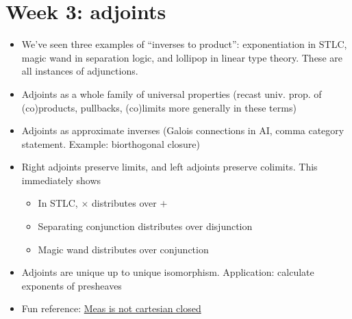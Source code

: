 \chapter{Week 3: adjoints}

\begin{itemize}
\item We've seen three examples of ``inverses to product'':
  exponentiation in STLC, magic wand in separation logic,
  and lollipop in linear type theory.
  These are all instances of adjunctions.
\item Adjoints as a whole family of universal properties (recast univ. prop. of
  (co)products, pullbacks, (co)limits more generally in these terms)
\item Adjoints as approximate inverses (Galois connections in AI, comma category
  statement. Example: biorthogonal closure)
\item Right adjoints preserve limits, and left adjoints preserve colimits.
    This immediately shows \begin{itemize}
      \item In STLC, $\times$ distributes over $+$
      \item Separating conjunction distributes over disjunction
      \item Magic wand distributes over conjunction
    \end{itemize}
\item Adjoints are unique up to unique isomorphism. Application:
  calculate exponents of presheaves
\item Fun reference: \href{https://golem.ph.utexas.edu/category/2025/02/universal_characterization_of.html#c063905}{Meas is not cartesian closed}
\end{itemize}
